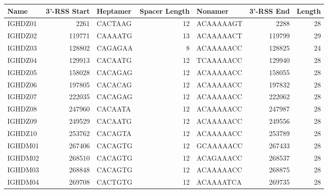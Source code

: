 \begin{tabular}{lrlrlrr}
  \toprule Name & 3'-RSS Start & Heptamer & Spacer Length & Nonamer & 3'-RSS End & Length \\ 
  \midrule IGHDZ01 & 2261 & CACTAAG & 12 & ACAAAAAGT & 2288 & 28 \\ 
  IGHDZ02 & 119771 & CAAAATG & 13 & ACAAAAACT & 119799 & 29 \\ 
  IGHDZ03 & 128802 & CAGAGAA & 8 & ACAAAAACC & 128825 & 24 \\ 
  IGHDZ04 & 129913 & CACAATG & 12 & TCAAAAACC & 129940 & 28 \\ 
  IGHDZ05 & 158028 & CACAGAG & 12 & ACAAAAACC & 158055 & 28 \\ 
  IGHDZ06 & 197805 & CACACAG & 12 & ACAAAAACC & 197832 & 28 \\ 
  IGHDZ07 & 222035 & CACAGAG & 12 & ACAAAAACC & 222062 & 28 \\ 
  IGHDZ08 & 247960 & CACAATA & 12 & ACAAAAACC & 247987 & 28 \\ 
  IGHDZ09 & 249529 & CACAATG & 12 & ACAAAAACC & 249556 & 28 \\ 
  IGHDZ10 & 253762 & CACAGTA & 12 & ACAAAAACC & 253789 & 28 \\ 
  IGHDM01 & 267406 & CACAGTG & 12 & GCAAAAACC & 267433 & 28 \\ 
  IGHDM02 & 268510 & CACAGTG & 12 & ACAGAAACC & 268537 & 28 \\ 
  IGHDM03 & 268848 & CACAGTG & 12 & ACAAAAACC & 268875 & 28 \\ 
  IGHDM04 & 269708 & CACTGTG & 12 & ACAAAATCA & 269735 & 28 \\ 
   \bottomrule \end{tabular}
